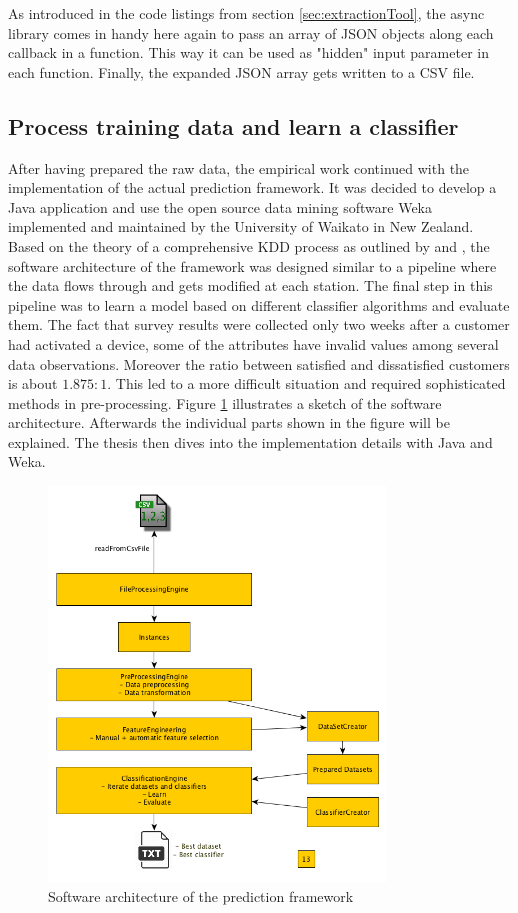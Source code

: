 As introduced in the code listings from section \ref{sec:extractionTool}, the async library comes in handy here again to pass an array of JSON objects along each callback in a function. This way it can be used as "hidden" input parameter in each function. Finally, the expanded JSON array gets written to a CSV file. 

\subsection{Process training data and learn a classifier}
After having prepared the raw data, the empirical work continued with the implementation of the actual prediction framework. It was decided to develop a Java application and use the open source data mining software Weka implemented and maintained by the University of Waikato in New Zealand. Based on the theory of a comprehensive KDD process as outlined by \cite{fayyad1996data} and \cite{neckel2015}, the software architecture of the framework was designed similar to a pipeline where the data flows through and gets modified at each station. The final step in this pipeline was to learn a model based on different classifier algorithms and evaluate them. The fact that survey results were collected only two weeks after a customer had activated a device, some of the attributes have invalid values among several data observations. Moreover the ratio between satisfied and dissatisfied customers is about $1.875:1$. This led to a more difficult situation and required sophisticated methods in pre-processing. Figure \ref{fig:softwareArchitecture} illustrates a sketch of the software architecture. Afterwards the individual parts shown in the figure will be explained. The thesis then dives into the implementation details with Java and Weka.

\begin{figure}
	\centering
	\includegraphics[width=0.8\textwidth]{img/softwareArchitecture.png}
	\caption{Software architecture of the prediction framework}
	\label{fig:softwareArchitecture}
\end{figure} 


